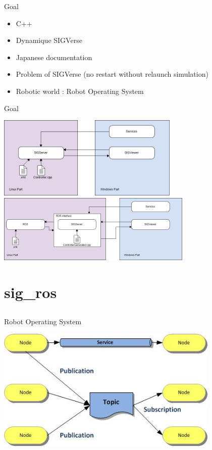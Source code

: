 \documentclass[11pt]{beamer}
\begin{document}
\begin{frame}{Goal}
	\begin{itemize}
		\item C++
		\item Dynamique SIGVerse
		\item Japanese documentation
		\item Problem of SIGVerse (no restart without relaunch simulation)
		\item Robotic world : Robot Operating System
	\end{itemize}
\end{frame}

\begin{frame}{Goal}
	\begin{center}
		\includegraphics[width=0.65\textwidth]{images/SIGVerseSimple.png}\\
		\vspace{0.3cm}
		\includegraphics[width=0.7\textwidth]{images/SIGVerseROS.png}	
	\end{center}
\end{frame}

\section{sig\_ros}
\subsection*{}
\begin{frame}{Robot Operating System}
	\begin{center}
		\includegraphics[width=0.8\textwidth]{images/Concepts-de-base-ROS.jpg}
	\end{center}
\end{frame}
\end{document}
